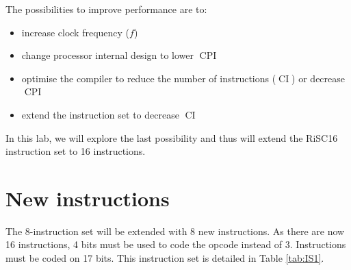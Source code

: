 \documentclass[10pt,a4paper]{article}
\theoremstyle{definition}%
\newcommand{\on}[1]{\operatorname{#1}}
\begin{document}


The possibilities to improve performance are to:
\begin{itemize}
\item increase clock frequency ($f$)
\item change processor internal design to lower $\on{CPI}$
\item optimise the compiler to reduce the number of instructions ($\on{CI}$) or decrease $\on{CPI}$
\item extend the instruction set to decrease $\on{CI}$
\end{itemize}




In this lab, we will explore the last possibility and thus will extend the RiSC16 instruction set to 16 instructions.


\section{New instructions}


The 8-instruction set will be extended with 8 new instructions. As there are now 16 instructions, 4 bits must be used to code the opcode instead of 3. Instructions must be coded on 17 bits. This instruction set is detailed in Table \vref{tab:IS1}.
\end{document}
